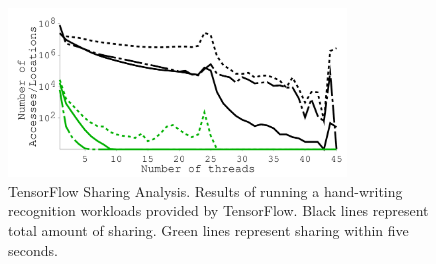 {
\begin{figure}[th]
\begin{center}
\centerline{\includegraphics[width=0.8\textwidth]{hotpot/Figures/g_plot_tensorflow_average.pdf}}
\caption[TensorFlow Sharing Analysis.]
{
TensorFlow Sharing Analysis.
Results of running a hand-writing recognition workloads provided by TensorFlow.
Black lines represent total amount of sharing.
Green lines represent sharing within five seconds.
}
\label{fig-tensorflow}
\end{center}
\end{figure}
}